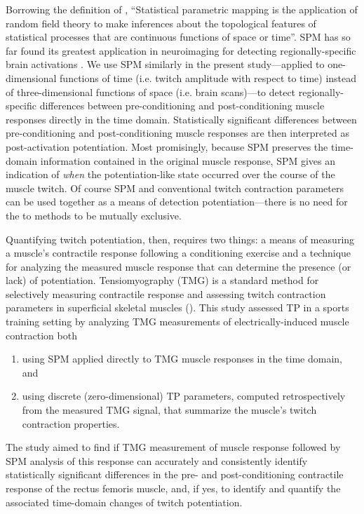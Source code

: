 \documentclass[utf8]{FrontiersinHarvard}
\begin{document}
Borrowing the definition of \cite{flandin},
``Statistical parametric mapping is the application of random field theory to make inferences about the topological features of statistical processes that are continuous functions of space or time''.
SPM has so far found its greatest application in neuroimaging for detecting regionally-specific brain activations \cite{friston}.
We use SPM similarly in the present study---applied to one-dimensional functions of time (i.e. twitch amplitude with respect to time) instead of three-dimensional functions of space (i.e. brain scans)---to detect regionally-specific differences between pre-conditioning and post-conditioning muscle responses directly in the time domain.
Statistically significant differences between pre-conditioning and post-conditioning muscle responses are then interpreted as post-activation potentiation.
Most promisingly, because SPM preserves the time-domain information contained in the original muscle response, SPM gives an indication of \textit{when} the potentiation-like state occurred over the course of the muscle twitch.
Of course SPM and conventional twitch contraction parameters can be used together as a means of detection potentiation---there is no need for the to methods to be mutually exclusive.

Quantifying twitch potentiation, then, requires two things: a means of measuring a muscle's contractile response following a conditioning exercise and a technique for analyzing the measured muscle response that can determine the presence (or lack) of potentiation.
Tensiomyography (TMG) is a standard method for selectively measuring contractile response and assessing twitch contraction parameters in superficial skeletal muscles (\cite{valencic, dahmane-fiber, dahmane-measurement, meglic, simunic, martin-rodriguez, ce}).
This study assessed TP in a sports training setting by analyzing TMG measurements of electrically-induced muscle contraction both
\begin{enumerate}

    \item using SPM applied directly to TMG muscle responses in the time domain, and

    \item using discrete (zero-dimensional) TP parameters, computed retrospectively from the measured TMG signal, that summarize the muscle's twitch contraction properties.

\end{enumerate}
The study aimed to find if TMG measurement of muscle response followed by SPM analysis of this response can accurately and consistently identify statistically significant differences in the pre- and post-conditioning contractile response of the rectus femoris muscle, and,
if yes, to identify and quantify the associated time-domain changes of twitch potentiation.
\end{document}
